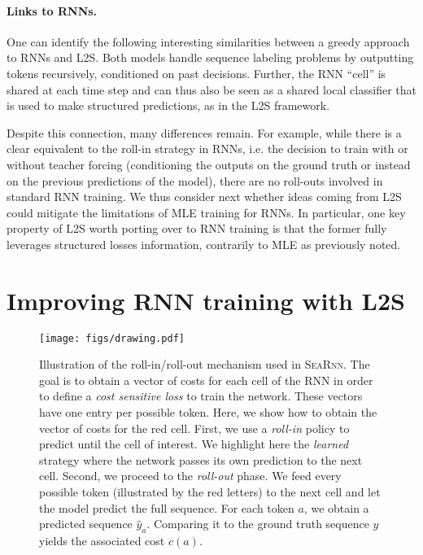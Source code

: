 \documentclass{article}
\newcommand{\SEARNN}{\textsc{SeaRnn}}
\begin{document}
	\vspace{-3mm}
	\paragraph{Links to RNNs.}	
	One can identify the following interesting similarities between a greedy approach to RNNs and L2S.
	Both models handle sequence labeling problems by outputting tokens recursively, conditioned on past decisions.
	Further, the RNN ``cell'' is shared at each time step and can thus also be seen as a shared local classifier that is used to make structured predictions, as in the L2S framework.

	Despite this connection, many differences remain.
	For example, while there is a clear equivalent to the roll-in strategy in RNNs, i.e. the decision to train with or without teacher forcing (conditioning the outputs on the ground truth or instead on the previous predictions of the model), there are no roll-outs involved in standard RNN training.
	We thus consider next whether ideas coming from L2S could mitigate the limitations of MLE training for RNNs.
	In particular, one key property of L2S worth porting over to RNN training is that the former fully leverages structured losses information, contrarily to MLE as previously noted.


	\vspace{-1mm}
	\section{Improving RNN training with L2S}\label{sec:TL}
	\vspace{-1mm}
\begin{figure}[t!]
	\centering
	\texttt{[image: figs/drawing.pdf]}
	\caption{
		\footnotesize
		Illustration of the roll-in/roll-out mechanism used in \SEARNN.
		The goal is to obtain a vector of costs for each cell of the RNN in order to define a \emph{cost sensitive loss} to train the network.
		These vectors have one entry per possible token.
		Here, we show how to obtain the vector of costs for the red cell.
		First, we use a \emph{roll-in} policy to predict until the cell of interest.
		We highlight here the \emph{learned} strategy where the network passes its own prediction to the next cell.
		Second, we proceed to the \emph{roll-out} phase.
		We feed every possible token (illustrated by the red letters) to the next cell and let the model predict the full sequence.
		For each token $a$, we obtain a predicted sequence $\hat{y}_a$.
		Comparing it to the ground truth sequence $y$ yields the associated cost $c(a)$.
	}
	\vspace{-4mm} %
	\label{fig:mainpaper}
\end{figure}
\end{document}
